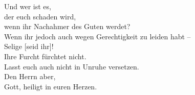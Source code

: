         Und wer ist es, \\
            der euch schaden wird, \\
            wenn ihr Nachahmer des Guten werdet? \\
        Wenn ihr jedoch auch wegen Gerechtigkeit zu leiden habt – \\
            Selige [seid ihr]! \\
            Ihre Furcht fürchtet nicht. \\
            Lasst euch auch nicht in Unruhe versetzen. \\
                Den Herrn aber, \\
                Gott, heiligt in euren Herzen. \\

